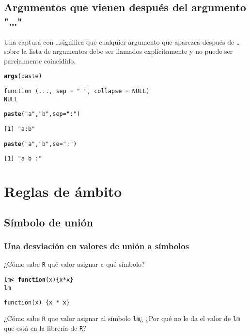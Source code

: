 \documentclass{article}\usepackage[]{graphicx}\usepackage[]{color}
\makeatletter
\newcommand{\hlstr}[1]{\textcolor[rgb]{0.192,0.494,0.8}{#1}}%
\newcommand{\hlopt}[1]{\textcolor[rgb]{0,0,0}{#1}}%
\newcommand{\hlstd}[1]{\textcolor[rgb]{0.345,0.345,0.345}{#1}}%
\newcommand{\hlkwa}[1]{\textcolor[rgb]{0.161,0.373,0.58}{\textbf{#1}}}%
\newcommand{\hlkwb}[1]{\textcolor[rgb]{0.69,0.353,0.396}{#1}}%
\newcommand{\hlkwc}[1]{\textcolor[rgb]{0.333,0.667,0.333}{#1}}%
\newcommand{\hlkwd}[1]{\textcolor[rgb]{0.737,0.353,0.396}{\textbf{#1}}}%
\newenvironment{kframe}{%
 \def\at@end@of@kframe{}%
 \ifinner\ifhmode%
  \def\at@end@of@kframe{\end{minipage}}%
  \begin{minipage}{\columnwidth}%
 \fi\fi%
 \def\FrameCommand##1{\hskip\@totalleftmargin \hskip-\fboxsep
 \colorbox{shadecolor}{##1}\hskip-\fboxsep
     \hskip-\linewidth \hskip-\@totalleftmargin \hskip\columnwidth}%
 \MakeFramed {\advance\hsize-\width
   \@totalleftmargin\z@ \linewidth\hsize
   \@setminipage}}%
 {\par\unskip\endMakeFramed%
 \at@end@of@kframe}
\newenvironment{knitrout}{}{} %
\makeatother
\begin{document}
  \subsection{Argumentos que vienen después del argumento "\dots"}
  Una captura con \dots significa que cualquier argumento que aparezca después de \dots sobre la lista de argumentos debe ser llamados explícitamente y no puede ser parcialmente coincidido.
\begin{knitrout}
\color{fgcolor}\begin{kframe}
\begin{alltt}
  \hlkwd{args}\hlstd{(paste)}
\end{alltt}
\begin{verbatim}
function (..., sep = " ", collapse = NULL) 
NULL
\end{verbatim}
\begin{alltt}
  \hlkwd{paste}\hlstd{(}\hlstr{"a"}\hlstd{,} \hlstr{"b"}\hlstd{,} \hlkwc{sep} \hlstd{=} \hlstr{":"}\hlstd{)}
\end{alltt}
\begin{verbatim}
[1] "a:b"
\end{verbatim}
\begin{alltt}
  \hlkwd{paste}\hlstd{(}\hlstr{"a"}\hlstd{,} \hlstr{"b"}\hlstd{,} \hlkwc{se} \hlstd{=} \hlstr{":"}\hlstd{)}
\end{alltt}
\begin{verbatim}
[1] "a b :"
\end{verbatim}
\end{kframe}
\end{knitrout}
  
\section{Reglas de ámbito}
  \subsection{Símbolo de unión}
    \subsubsection{Una desviación en valores de unión a símbolos}
    ¿Cómo sabe \texttt{R} qué valor asignar a qué símbolo?
\begin{knitrout}
\color{fgcolor}\begin{kframe}
\begin{alltt}
  \hlstd{lm} \hlkwb{<-} \hlkwa{function}\hlstd{(}\hlkwc{x}\hlstd{) \{x} \hlopt{*} \hlstd{x\}}
  \hlstd{lm}
\end{alltt}
\begin{verbatim}
function(x) {x * x}
\end{verbatim}
\end{kframe}
\end{knitrout}
    ¿Cómo sabe \texttt{R} que valor asignar al símbolo \texttt{lm}¿ ¿Por qué no le da el valor de \texttt{lm} que está en la librería de \texttt{R}?

  
  
\end{document}
